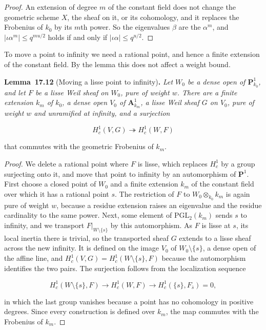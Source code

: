 \documentclass[11pt]{article}
\newenvironment{bpstatement}[2]{\par\addvspace{0.6\baselineskip}\noindent\textbf{#1}#2\textbf{.}\enspace\ignorespaces}
  {\par\addvspace{0.4\baselineskip}}
\newenvironment{bpstatementit}[2]{\begin{bpstatement}{#1}{#2}\itshape\ignorespaces}{\end{bpstatement}}
\begin{document}
\begin{proof}[{Proof}]\label{bp36}%
An extension of degree \(m\) of the constant field does not change the geometric scheme \(X\), the sheaf on it, or its cohomology, and it replaces the Frobenius of \(k_0\) by its \(m\)th power. So the eigenvalues \(\beta\) are the \(\alpha^m\), and \(|\iota\alpha^m|\le q^{mu/2}\) holds if and only if \(|\iota\alpha|\le q^{u/2}\).
\end{proof}

\label{bp37}%
To move a point to infinity we need a rational point, and hence a finite extension of the constant field. By the lemma this does not affect a weight bound.

\label{bp38}%
\begin{bpstatementit}{Lemma~17.12}{ (Moving a lisse point to infinity)}
Let \(W_0\) be a dense open of \(\mathbf P^1_{k_0}\), and let \(F\) be a lisse Weil sheaf on \(W_0\), pure of weight \(w\). There are a finite extension \(k_m\) of \(k_0\), a dense open \(V_0\) of \(\mathbf A^1_{k_m}\), a lisse Weil sheaf \(G\) on \(V_0\), pure of weight \(w\) and unramified at infinity, and a surjection

\[
H_c^1(V,G)\twoheadrightarrow H_c^1(W,F)
\]

that commutes with the geometric Frobenius of \(k_m\).
\end{bpstatementit}

\begin{proof}[{Proof}]\label{bp39}%
We delete a rational point where \(F\) is lisse, which replaces \(H^1_c\) by a group surjecting onto it, and move that point to infinity by an automorphism of \(\mathbf P^1\). First choose a closed point of \(W_0\) and a finite extension \(k_m\) of the constant field over which it has a rational point \(s\). The restriction of \(F\) to \(W_0\otimes_{k_0}k_m\) is again pure of weight \(w\), because a residue extension raises an eigenvalue and the residue cardinality to the same power. Next, some element of \(\mathrm{PGL}_2(k_m)\) sends \(s\) to infinity, and we transport \(F|_{W\setminus\{s\}}\) by this automorphism. As \(F\) is lisse at \(s\), its local inertia there is trivial, so the transported sheaf \(G\) extends to a lisse sheaf across the new infinity. It is defined on the image \(V_0\) of \(W_0\setminus\{s\}\), a dense open of the affine line, and \(H^1_c(V,G)=H^1_c(W\setminus\{s\},F)\) because the automorphism identifies the two pairs. The surjection follows from the localization sequence

\[
H_c^1(W\setminus\{s\},F)\to H_c^1(W,F)\to H_c^1(\{s\},F_{\bar s})=0,
\]

in which the last group vanishes because a point has no cohomology in positive degrees. Since every construction is defined over \(k_m\), the map commutes with the Frobenius of \(k_m\).
\end{proof}
\end{document}
